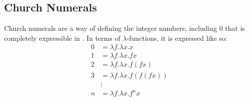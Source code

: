 \subsection{Church Numerals}\label{subsec:Church_Numerals}
Church numerals are a way of defining the integer numbers, including 0 that is completely expressible in .
In terms of $\lambda$-functions, it is expressed like so:
\begin{equation}\label{eq:Church_Numerals}
  \begin{aligned}
    0 &= \lambda f.\lambda x.x \\
    1 &= \lambda f.\lambda x. fx \\
    2 &= \lambda f.\lambda x. f(f x) \\
    3 &= \lambda f.\lambda x. f(f (f x)) \\
    &\vdots \\
    n &= \lambda f. \lambda x. f^{n} x \\
  \end{aligned}
\end{equation}


